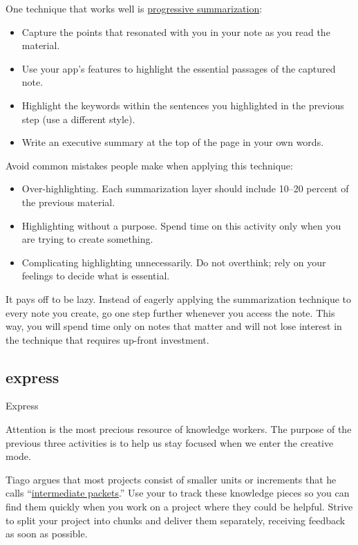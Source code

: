 \documentclass{article}
\begin{document}
One technique that works well is \href{https://fortelabs.com/blog/progressive-summarization-a-practical-technique-for-designing-discoverable-notes/}{progressive summarization}:
\begin{itemize}
  \item Capture the points that resonated with you in your note as you read the material.
  \item Use your app's features to highlight the essential passages of the captured note.
  \item Highlight the keywords within the sentences you highlighted in the previous step (use a different style).
  \item Write an executive summary at the top of the page in your own words.
\end{itemize}

Avoid common mistakes people make when applying this technique:
\begin{itemize}
  \item 
    Over-highlighting.
    Each summarization layer should include 10--20 percent of the previous material.
  \item 
    Highlighting without a purpose.
    Spend time on this activity only when you are trying to create something.
  \item 
    Complicating highlighting unnecessarily.
    Do not overthink; rely on your feelings to decide what is essential.
\end{itemize}

It pays off to be lazy.
Instead of eagerly applying the summarization technique to every note you create, go one step further whenever you access the note.
This way, you will spend time only on notes that matter and will not lose interest in the technique that requires up-front investment.

\subsection{express}{Express}

Attention is the most precious resource of knowledge workers.
The purpose of the previous three activities is to help us stay focused when we enter the creative mode.

Tiago argues that most projects consist of smaller units or increments that he calls ``\href{https://fortelabs.com/blog/just-in-time-pm-4-intermediate-packets/}{intermediate packets}.''
Use your  to track these knowledge pieces so you can find them quickly when you work on a project where they could be helpful.
Strive to split your project into chunks and deliver them separately, receiving feedback as soon as possible.
\end{document}
